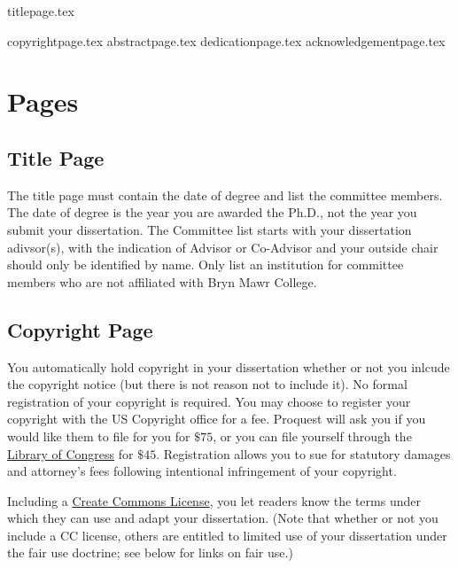 \documentclass[12pt]{report}
\begin{document}
{titlepage.tex} %

{copyrightpage.tex}
{abstractpage.tex}
\setcounter{page}{2}
{dedicationpage.tex}
{acknowledgementpage.tex}
\tableofcontents
\newpage
\listoffigures
{}
\newpage
\listoftables
{}
\newpage
\listofappendices
\newpage
\chapter{Pages}
\section{Title Page}
The title page must contain the date of degree and list the committee members. The date of degree is the year you are awarded the Ph.D., not the year you submit your dissertation. The Committee list starts with your dissertation adivsor(s), with the indication of Advisor or Co-Advisor and your outside chair should only be identified by name. Only list an institution for committee members who are not affiliated with Bryn Mawr College.
\section{Copyright Page}
You automatically hold copyright in your dissertation whether or not you inlcude the copyright notice (but there is not reason not to include it). No formal registration of your copyright is required. You may choose to register your copyright with the US Copyright office for a fee. Proquest will ask you if you would like them to file for you for $\$75$, or you can file yourself through the \href{https://www.copyright.gov/registration/}{Library of Congress} for $\$45$. Registration allows you to sue for statutory damages and attorney's fees following intentional infringement of your copyright.

Including a \href{https://creativecommons.org/licenses/}{Create Commons License}, you let readers know the terms under which they can use and adapt your dissertation. (Note that whether or not you include a CC license, others are entitled to limited use of your dissertation under the fair use doctrine; see below for links on fair use.)
\end{document}
